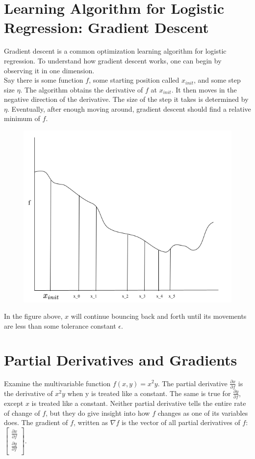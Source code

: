 \documentclass{article}
\begin{document}
    \section{Learning Algorithm for Logistic Regression: Gradient Descent}
    Gradient descent is a common optimization learning algorithm for logistic regression. To understand how gradient descent works, one can begin by observing it in one dimension. \\

    Say there is some function $f$, some starting position called $x_{init}$, and some step size $\eta$. The algorithm obtains the derivative of $f$ at $x_{init}$. It then moves in the negative direction of the derivative. The size of the step it takes is determined by $\eta$. Eventually, after enough moving around, gradient descent should find a relative minimum of $f$. \\

    \begin{figure}[H]
        \centering
        \includegraphics[width=0.5\linewidth]{Gradient Descent.png}
    \end{figure}

    In the figure above, $x$ will continue bouncing back and forth until its movements are less than some tolerance constant $\epsilon$. 

    \section{Partial Derivatives and Gradients}
    Examine the multivariable function $f(x,y) = x^2y$. The partial derivative $\frac{\partial{x}}{\partial{f}}$ is the derivative of $x^2y$ when y is treated like a constant. The same is true for $\frac{\partial{y}}{\partial{f}}$, except $x$ is treated like a constant. Neither partial derivative tells the entire rate of change of $f$, but they do give insight into how $f$ changes as one of its variables does. The gradient of $f$, written as $\nabla{f}$ is the vector of all partial derivatives of $f$: 
        $\begin{bmatrix}
               \frac{\partial{x}}{\partial{f}} \\
               \frac{\partial{y}}{\partial{f}} \\
        \end{bmatrix}$. 
\end{document}
